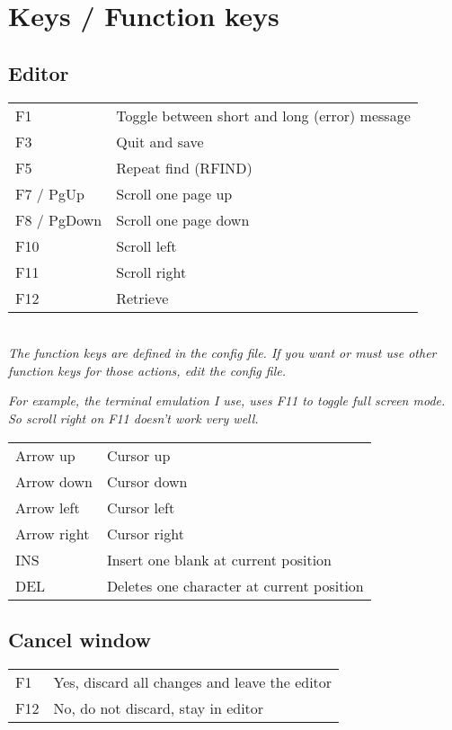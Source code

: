 \documentclass{report}
\begin{document}
\chapter{Keys / Function keys}

\section{Editor}

\begin{tabular}{l l}
F1 & Toggle between short and long (error) message \\
F3 & Quit and save \\
F5 & Repeat find (RFIND) \\
F7 / PgUp & Scroll one page up \\
F8 / PgDown & Scroll one page down \\
F10 & Scroll left \\
F11 & Scroll right \\
F12 & Retrieve \\
\end{tabular}
\\

\textit{The function keys are defined in the config file. If you want or must
use other function keys for those actions, edit the config file.}

\textit{For example, the terminal emulation I
use, uses F11 to toggle full screen mode. So scroll right on F11 doesn't work 
very well.}  \\

\begin{tabular}{l l}
Arrow up & Cursor up \\
Arrow down & Cursor down \\
Arrow left & Cursor left \\
Arrow right & Cursor right \\
INS & Insert one blank at current position \\
DEL & Deletes one character at current position \\
\end{tabular}

\section{Cancel window}

\begin{tabular}{l l}
F1 & Yes, discard all changes and leave the editor \\
F12 & No, do not discard, stay in editor \\
\end{tabular}
\end{document}
